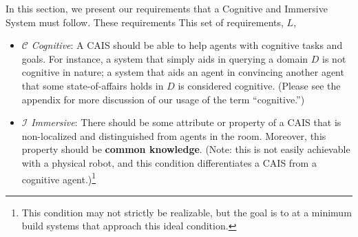 \documentclass{article}
\begin{document}
In this section, we present our requirements that a Cognitive and Immersive System must follow. 
These requirements
This
set of requirements, $L$, 

\begin{itemize}
    \item $\mathcal{C}$ \emph{Cognitive}: A CAIS should be able to
      help agents with cognitive tasks and goals.  For instance, a
      system that simply aids in querying a domain $D$ is not
      cognitive in nature; a system that aids an agent in convincing
      another agent that some state-of-affairs holds in $D$ is
      considered cognitive. (Please see the appendix for more
      discussion of our usage of the term ``cognitive.'')
    \item $\mathcal{I}$ \emph{Immersive}:  There should
      be some attribute or property of a CAIS that is non-localized
      and distinguished from agents in the room.  Moreover, this
      property should be \textbf{common knowledge}.  (Note: this is
      not easily achievable with a physical robot, and this condition
      differentiates a CAIS from a cognitive
      agent.)\footnote{This condition may not strictly be realizable,
        but the goal is to at a minimum build systems that approach
        this ideal condition.}
\end{itemize}


\end{document}
